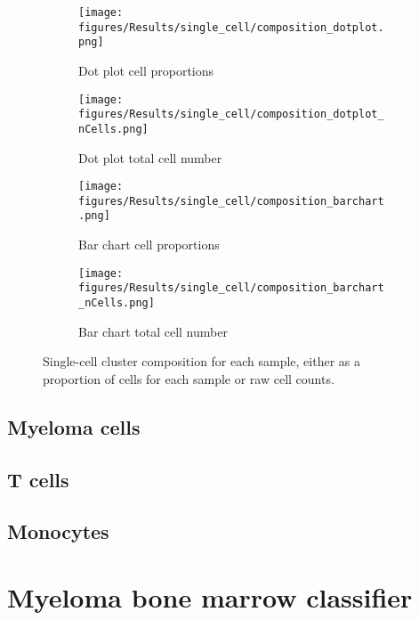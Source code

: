 \begin{figure}[pt]
\begin{subfigure}[t]{0.5\textwidth}
    \texttt{[image: figures/Results/single\_cell/composition\_dotplot.png]}
    \caption{Dot plot cell proportions}
    \label{fig:comp_dot}
\end{subfigure}
\begin{subfigure}[t]{0.5\textwidth}
    \texttt{[image: figures/Results/single\_cell/composition\_dotplot\_nCells.png]}
    \caption{Dot plot total cell number}
    \label{fig:comp_dot_ncells}
\end{subfigure}
%
\medskip
\begin{subfigure}[t]{0.5\textwidth}
    \texttt{[image: figures/Results/single\_cell/composition\_barchart.png]}
    \caption{Bar chart cell proportions}
    \label{fig:comp_bar}
\end{subfigure}
\begin{subfigure}[t]{0.5\textwidth}
    \texttt{[image: figures/Results/single\_cell/composition\_barchart\_nCells.png]}
    \caption{Bar chart total cell number}
    \label{fig:comp_bar_ncells}
\end{subfigure}
%
\caption[Single-cell cluster composition]{Single-cell cluster composition for each sample, either as a proportion of cells for each sample or raw cell counts.}
\label{fig:sc_comp_clusters}
\end{figure}


\subsection{Myeloma cells}

\subsection{T cells}

\subsection{Monocytes}


\section{Myeloma bone marrow classifier}